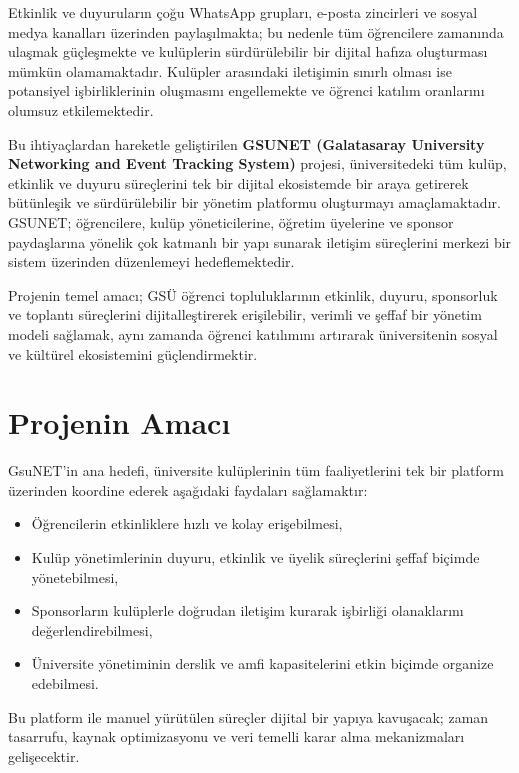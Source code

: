 \documentclass[a4paper,12pt]{report}
\begin{document}
Etkinlik ve duyuruların çoğu WhatsApp grupları, e-posta zincirleri ve sosyal medya kanalları üzerinden paylaşılmakta; bu nedenle tüm öğrencilere zamanında ulaşmak güçleşmekte ve kulüplerin sürdürülebilir bir dijital hafıza oluşturması mümkün olamamaktadır. Kulüpler arasındaki iletişimin sınırlı olması ise potansiyel işbirliklerinin oluşmasını engellemekte ve öğrenci katılım oranlarını olumsuz etkilemektedir.

Bu ihtiyaçlardan hareketle geliştirilen \textbf{GSUNET (Galatasaray University Networking and Event Tracking System)} projesi, üniversitedeki tüm kulüp, etkinlik ve duyuru süreçlerini tek bir dijital ekosistemde bir araya getirerek bütünleşik ve sürdürülebilir bir yönetim platformu oluşturmayı amaçlamaktadır. GSUNET; öğrencilere, kulüp yöneticilerine, öğretim üyelerine ve sponsor paydaşlarına yönelik çok katmanlı bir yapı sunarak iletişim süreçlerini merkezi bir sistem üzerinden düzenlemeyi hedeflemektedir.

Projenin temel amacı; GSÜ öğrenci topluluklarının etkinlik, duyuru, sponsorluk ve toplantı süreçlerini dijitalleştirerek erişilebilir, verimli ve şeffaf bir yönetim modeli sağlamak, aynı zamanda öğrenci katılımını artırarak üniversitenin sosyal ve kültürel ekosistemini güçlendirmektir.

\section{Projenin Amacı}

GsuNET’in ana hedefi, üniversite kulüplerinin tüm faaliyetlerini tek bir platform üzerinden koordine ederek aşağıdaki faydaları sağlamaktır:

\begin{itemize}
    \item Öğrencilerin etkinliklere hızlı ve kolay erişebilmesi,
    \item Kulüp yönetimlerinin duyuru, etkinlik ve üyelik süreçlerini şeffaf biçimde yönetebilmesi,
    \item Sponsorların kulüplerle doğrudan iletişim kurarak işbirliği olanaklarını değerlendirebilmesi,
    \item Üniversite yönetiminin derslik ve amfi kapasitelerini etkin biçimde organize edebilmesi.
\end{itemize}

Bu platform ile manuel yürütülen süreçler dijital bir yapıya kavuşacak; zaman tasarrufu, kaynak optimizasyonu ve veri temelli karar alma mekanizmaları gelişecektir.
\end{document}
